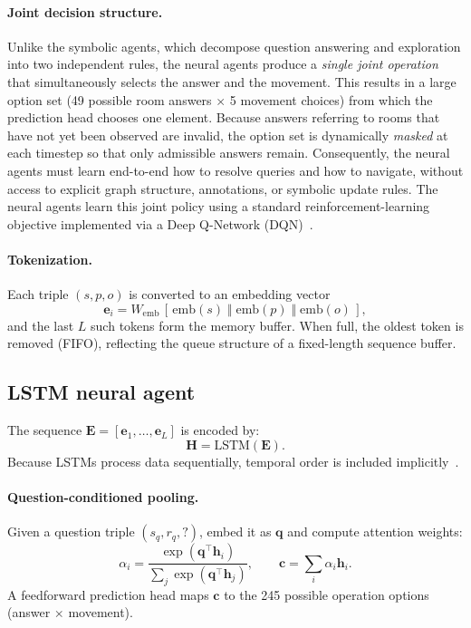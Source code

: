 \documentclass[Afour,sageh,times]{sagej}
\begin{document}
\paragraph{Joint decision structure.}
Unlike the symbolic agents, which decompose question answering and exploration into two
independent rules, the neural agents produce a \emph{single joint operation} that
simultaneously selects the answer and the movement. This results in a large option set
(49 possible room answers $\times$ 5 movement choices) from which the prediction head
chooses one element. Because answers referring to rooms that have not yet been observed
are invalid, the option set is dynamically \emph{masked} at each timestep so that only
admissible answers remain. Consequently, the neural agents must learn end-to-end how to
resolve queries and how to navigate, without access to explicit graph structure,
annotations, or symbolic update rules. The neural agents learn this joint policy using a
standard reinforcement-learning objective implemented via a Deep Q-Network
(DQN)~\citep{mnih2013playingatarideepreinforcement}.

\paragraph{Tokenization.}
Each triple $(s,p,o)$ is converted to an embedding vector
\[
\mathbf{e}_i
   = W_{\mathrm{emb}}\,[\,\mathrm{emb}(s)\;\Vert\;\mathrm{emb}(p)
      \;\Vert\;\mathrm{emb}(o)\,],
\]
and the last $L$ such tokens form the memory buffer. When full, the oldest token is
removed (FIFO), reflecting the queue structure of a fixed-length sequence buffer.

\subsection*{LSTM neural agent}
The sequence $\mathbf{E}=[\mathbf{e}_1,\dots,\mathbf{e}_L]$ is encoded by:
\[
\mathbf{H} = \text{LSTM}(\mathbf{E}).
\]
Because LSTMs process data sequentially, temporal order is included
implicitly~\citep{6795963}.

\paragraph{Question-conditioned pooling.}
Given a question triple $(s_q,r_q,?)$, embed it as $\mathbf{q}$ and compute
attention weights:
\[
\alpha_i = \frac{\exp(\mathbf{q}^\top \mathbf{h}_i)}
{\sum_j \exp(\mathbf{q}^\top \mathbf{h}_j)},\qquad
\mathbf{c} = \sum_i \alpha_i \mathbf{h}_i.
\]
A feedforward prediction head maps $\mathbf{c}$ to the 245 possible
operation options (answer $\times$ movement).
\end{document}
